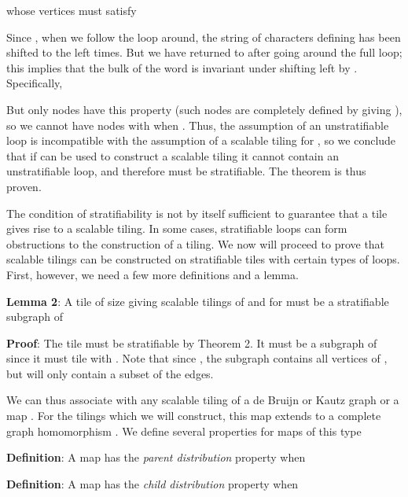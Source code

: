 \documentclass[12pt]{article}
\begin{document}
whose vertices must satisfy

Since , when we follow the loop around, the string
of characters defining  has been shifted to the left  times.  But we have returned to  after going around the
full loop; this implies that the bulk of the word  is invariant under shifting left by .
Specifically,

But only  nodes have this property (such nodes are
completely defined by giving ), so we cannot have 
 nodes with  when .  Thus, the
assumption of an unstratifiable loop is incompatible with the
assumption of a scalable tiling for , so we conclude that if
 can be used to construct a scalable tiling it cannot contain an
unstratifiable loop, and therefore must be stratifiable.  The theorem
is thus proven.
\vspace*{0.2in}

The condition of stratifiability is not by itself sufficient to
guarantee that a tile gives rise to a scalable tiling.   In some
cases, stratifiable loops can form obstructions to the construction of
a tiling.  We now will proceed to prove that scalable tilings can be
constructed on stratifiable tiles with certain types of loops.  First,
however, we need a few more definitions and a lemma.

\vspace*{0.1in}


\noindent
{\bf Lemma 2}: A tile of size  giving scalable tilings of
 and   for  must be a
stratifiable subgraph of

\vspace*{0.1in}

\noindent
{\bf Proof}: The tile must be stratifiable by Theorem 2.  It must be a
subgraph of  since it must tile  with .
Note that since , the subgraph contains all vertices of
, but will only contain a subset of the edges.
\vspace*{0.1in}

We can thus associate with any scalable tiling of a de Bruijn or Kautz graph
 or   a map
.  For the tilings which we will
construct, this map extends to a complete graph homomorphism
.  
We define several properties for
maps of this type
\vspace*{0.1in}

\noindent
{\bf Definition}:  A map  has  the
{\it parent distribution} property when

\vspace*{0.1in}

\noindent
{\bf Definition}:  A map  has  the
{\it child distribution} property when
\end{document}
